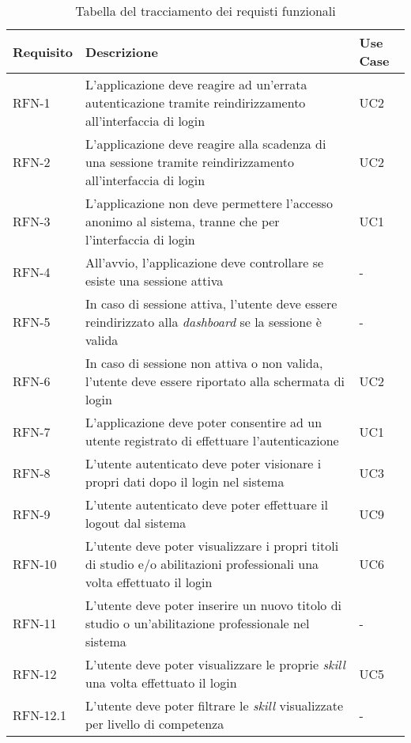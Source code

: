 \begin{table}%
\caption{Tabella del tracciamento dei requisti funzionali}
\label{tab:requisiti-funzionali}
\begin{tabularx}{\textwidth}{lXl}
\hline\hline
\textbf{Requisito} & \textbf{Descrizione} & \textbf{Use Case}\\
\hline
RFN-1 & L'applicazione deve reagire ad un'errata autenticazione tramite reindirizzamento all'interfaccia di login & UC2 \\
\hline
RFN-2 & L'applicazione deve reagire alla scadenza di una sessione tramite reindirizzamento all'interfaccia di login & UC2 \\
\hline
RFN-3 & L'applicazione non deve permettere l'accesso anonimo al sistema, tranne che per l'interfaccia di login & UC1 \\
\hline
RFN-4 & All'avvio, l'applicazione deve controllare se esiste una sessione attiva & - \\
\hline
RFN-5 & In caso di sessione attiva, l'utente deve essere reindirizzato alla \emph{dashboard} se la sessione è valida & - \\
\hline
RFN-6 & In caso di sessione non attiva o non valida, l'utente deve essere riportato alla schermata di login & UC2 \\
\hline
RFN-7 & L'applicazione deve poter consentire ad un utente registrato di effettuare l'autenticazione & UC1 \\
\hline
RFN-8 & L'utente autenticato deve poter visionare i propri dati dopo il login nel sistema & UC3 \\
\hline
RFN-9 & L'utente autenticato deve poter effettuare il logout dal sistema & UC9 \\
\hline
RFN-10 & L'utente deve poter visualizzare i propri titoli di studio e/o abilitazioni professionali una volta effettuato il login & UC6 \\
\hline
RFN-11 & L'utente deve poter inserire un nuovo titolo di studio o un'abilitazione professionale nel sistema & - \\
\hline
RFN-12 & L'utente deve poter visualizzare le proprie \emph{skill} una volta effettuato il login & UC5 \\
\hline
RFN-12.1 & L'utente deve poter filtrare le \emph{skill} visualizzate per livello di competenza & - \\
\hline

\end{tabularx}
\end{table}
